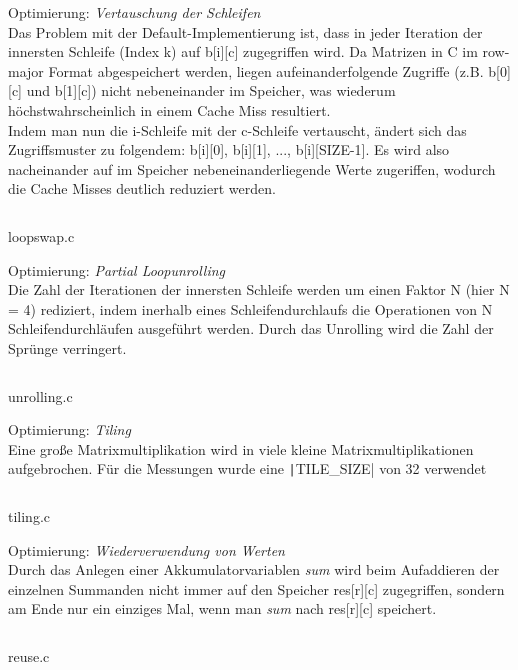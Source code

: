 \documentclass[a4paper]{article}
\begin{document}
Optimierung: \textit{Vertauschung der Schleifen} \\
Das Problem mit der Default-Implementierung ist, dass in jeder Iteration der innersten Schleife (Index k) auf b[i][c] zugegriffen wird. Da Matrizen in C im row-major Format abgespeichert werden, liegen aufeinanderfolgende Zugriffe (z.B. b[0][c] und b[1][c]) nicht nebeneinander im Speicher, was wiederum höchstwahrscheinlich in einem Cache Miss resultiert. \\
Indem man nun die i-Schleife mit der c-Schleife vertauscht, ändert sich das Zugriffsmuster zu folgendem: b[i][0], b[i][1], ..., b[i][SIZE-1]. Es wird also nacheinander auf im Speicher nebeneinanderliegende Werte zugeriffen, wodurch die Cache Misses deutlich reduziert werden.
\begin{listing}[H]
\inputminted[firstline=3]{c}{loopswap.c}
\caption{loopswap.c}
\end{listing}

Optimierung: \textit{Partial Loopunrolling} \\
Die Zahl der Iterationen der innersten Schleife werden um einen Faktor N (hier N = 4) rediziert, indem inerhalb eines Schleifendurchlaufs die Operationen von N Schleifendurchläufen ausgeführt werden. Durch das Unrolling wird die Zahl der Sprünge verringert.
\begin{listing}[H]
\inputminted[firstline=3]{c}{unrolling.c}
\caption{unrolling.c}
\end{listing}

Optimierung: \textit{Tiling} \\
Eine große Matrixmultiplikation wird in viele kleine Matrixmultiplikationen aufgebrochen. Für die Messungen wurde eine \texttt|TILE_SIZE| von 32 verwendet
\begin{listing}[H]
\inputminted[firstline=3]{c}{tiling.c}
\caption{tiling.c}
\end{listing}

Optimierung: \textit{Wiederverwendung von Werten} \\
Durch das Anlegen einer Akkumulatorvariablen \textit{sum} wird beim Aufaddieren der einzelnen Summanden nicht immer auf den Speicher res[r][c] zugegriffen, sondern am Ende nur ein einziges Mal, wenn man \textit{sum} nach res[r][c] speichert.
\begin{listing}[H]
\inputminted[firstline=1]{c}{reuse.c}
\caption{reuse.c}
\end{listing}
\end{document}

